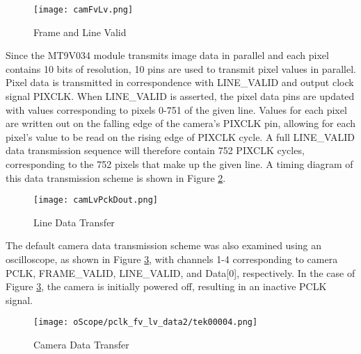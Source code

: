 \begin{figure}[H]
	\centerline{\texttt{[image: camFvLv.png]}}
	\caption{Frame and Line Valid \cite{mt9v034}}
	\label{FvLv}
\end{figure}

\par
Since the MT9V034 module transmits image data in parallel and each pixel contains 10 bits of resolution, 10 pins are used to transmit pixel values in parallel. Pixel data is transmitted in correspondence with LINE\_VALID and output clock signal PIXCLK. When LINE\_VALID is asserted, the pixel data pins are updated with values corresponding to pixels 0-751 of the given line. Values for each pixel are written out on the falling edge of the camera's PIXCLK pin, allowing for each pixel's value to be read on the rising edge of PIXCLK cycle. A full LINE\_VALID data transmission sequence will therefore contain 752 PIXCLK cycles, corresponding to the 752 pixels that make up the given line. A timing diagram of this data transmission scheme is shown in Figure \ref{LvDout}.  
\begin{figure}[H]
	\centerline{\texttt{[image: camLvPckDout.png]}}
	\caption{Line Data Transfer \cite{mt9v034}}
	\label{LvDout}
\end{figure}

\par
The default camera data transmission scheme was also examined using an oscilloscope, as shown in Figure \ref{camDataTransfer}, with channels 1-4 corresponding to camera PCLK, FRAME\_VALID, LINE\_VALID, and Data[0], respectively. In the case of Figure \ref{camDataTransfer}, the camera is initially powered off, resulting in an inactive PCLK signal.
\begin{figure}[H]
	\centerline{\texttt{[image: oScope/pclk\_fv\_lv\_data2/tek00004.png]}}
	\caption{Camera Data Transfer}
	\label{camDataTransfer}
\end{figure}


